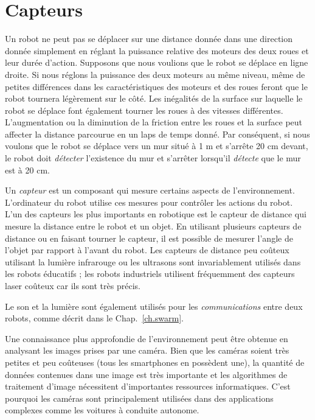 
\chapter{Capteurs}\label{ch.sensors}

Un robot ne peut pas se déplacer sur une distance donnée dans une direction donnée simplement en réglant la puissance relative des moteurs des deux roues et leur durée d'action. Supposons que nous voulions que le robot se déplace en ligne droite. Si nous réglons la puissance des deux moteurs au même niveau, même de petites différences dans les caractéristiques des moteurs et des roues feront que le robot tournera légèrement sur le côté. Les inégalités de la surface sur laquelle le robot se déplace font également tourner les roues à des vitesses différentes. L'augmentation ou la diminution de la friction entre les roues et la surface peut affecter la distance parcourue en un laps de temps donné. Par conséquent, si nous voulons que le robot se déplace vers un mur situé à 1 m et s'arrête 20 cm devant, le robot doit \emph{détecter} l'existence du mur et s'arrêter lorsqu'il \emph{détecte} que le mur est à 20 cm.

Un \emph{capteur} est un composant qui mesure certains aspects de l'environnement. L'ordinateur du robot utilise ces mesures pour contrôler les actions du robot. L'un des capteurs les plus importants en robotique est le capteur de distance qui mesure la distance entre le robot et un objet. En utilisant plusieurs capteurs de distance ou en faisant tourner le capteur, il est possible de mesurer l'angle de l'objet par rapport à l'avant du robot. Les capteurs de distance peu coûteux utilisant la lumière infrarouge ou les ultrasons sont invariablement utilisés dans les robots éducatifs ; les robots industriels utilisent fréquemment des capteurs laser coûteux car ils sont très précis.

Le son et la lumière sont également utilisés pour les \emph{communications} entre deux robots, comme décrit dans le Chap.~\ref{ch.swarm}.

Une connaissance plus approfondie de l'environnement peut être obtenue en analysant les images prises par une caméra. Bien que les caméras soient très petites et peu coûteuses (tous les smartphones en possèdent une), la quantité de données contenues dans une image est très importante et les algorithmes de traitement d'image nécessitent d'importantes ressources informatiques. C'est pourquoi les caméras sont principalement utilisées dans des applications complexes comme les voitures à conduite autonome.

